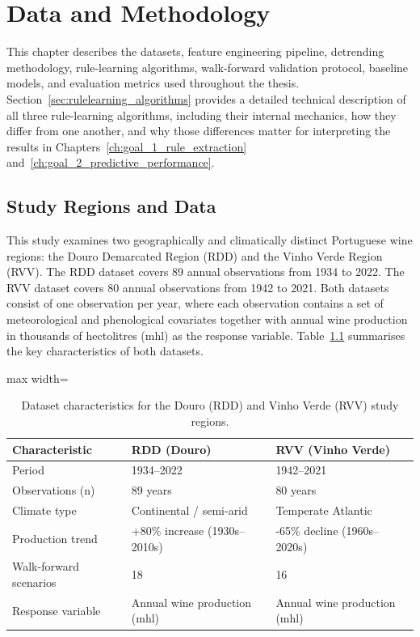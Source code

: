 
\chapter{Data and Methodology}\label{ch:data_and_methodology}

This chapter describes the datasets, feature engineering pipeline, detrending methodology, rule-learning algorithms, walk-forward validation protocol, baseline models, and evaluation metrics used throughout the thesis. Section~\ref{sec:rulelearning_algorithms} provides a detailed technical description of all three rule-learning algorithms, including their internal mechanics, how they differ from one another, and why those differences matter for interpreting the results in Chapters~\ref{ch:goal_1_rule_extraction} and~\ref{ch:goal_2_predictive_performance}.


\section{Study Regions and Data}\label{sec:study_regions_and_data}

This study examines two geographically and climatically distinct Portuguese wine regions: the Douro Demarcated Region (RDD) and the Vinho Verde Region (RVV). The RDD dataset covers 89 annual observations from 1934 to 2022. The RVV dataset covers 80 annual observations from 1942 to 2021. Both datasets consist of one observation per year, where each observation contains a set of meteorological and phenological covariates together with annual wine production in thousands of hectolitres (mhl) as the response variable. Table~\ref{tab:ch3a_1} summarises the key characteristics of both datasets.

\begin{table}[htbp]
  \centering
  \caption{Dataset characteristics for the Douro (RDD) and Vinho Verde (RVV) study regions.}\label{tab:ch3a_1}
  \small
  \begin{adjustbox}{max width=\textwidth}
    \begin{tabularx}{\textwidth}{l|l|X}
  \toprule
  Characteristic & RDD (Douro) & RVV (Vinho Verde) \\
  \midrule
  Period & 1934--2022 & 1942--2021 \\
  Observations (n) & 89 years & 80 years \\
  Climate type & Continental / semi-arid & Temperate Atlantic \\
  Production trend & +80\% increase (1930s--2010s) & -65\% decline (1960s--2020s) \\
  Walk-forward scenarios & 18 & 16 \\
  Response variable & Annual wine production (mhl) & Annual wine production (mhl) \\
  \bottomrule
\end{tabularx}
  \end{adjustbox}

\end{table}




